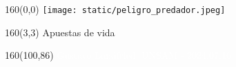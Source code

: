 \documentclass[shownotes,aspectratio=169]{beamer}
\begin{document}
\color{black!85}
\large


\begin{frame}[plain]
\begin{textblock}{160}(0,0)
\texttt{[image: static/peligro\_predador.jpeg]}
\end{textblock}
\begin{textblock}{160}(3,3)
\LARGE Apuestas de vida
\end{textblock}

\begin{textblock}{160}(100,86)
\footnotesize \textcolor{white}{Gustavo Landfried. UNSAM - 2024.07.16}
\end{textblock}
\end{frame}



%
%
%
\end{document}
